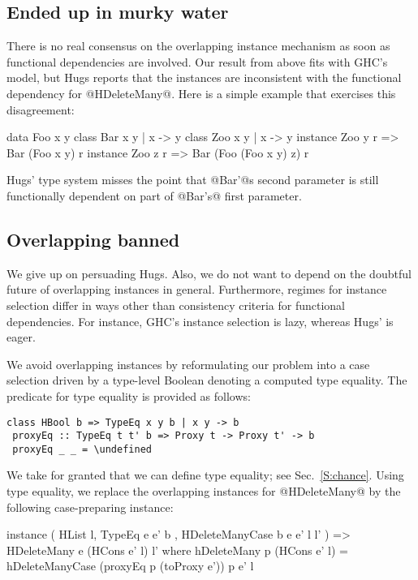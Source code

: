 \documentclass[nocopyrightspace,preprint]{sigplan-proc}
\newcommand{\undefined}{\ensuremath{\bot}}
\begin{document}
\medskip

\subsection*{Ended up in murky water}

There is no real consensus on the overlapping instance mechanism as
soon as functional dependencies are involved. Our result from above
fits with GHC's model, but Hugs reports that the instances are
inconsistent with the functional dependency for @HDeleteMany@. Here is
a simple example that exercises this disagreement:

\begin{code}
 data Foo x y
 class Bar x y | x -> y
 class Zoo x y | x -> y
 instance Zoo y r => Bar (Foo x y) r
 instance Zoo z r => Bar (Foo (Foo x y) z) r
\end{code}

Hugs' type system misses the point that @Bar'@s second parameter is
still functionally dependent on part of @Bar's@ first parameter.


\medskip

\subsection*{Overlapping banned}

We give up on persuading Hugs. Also, we do not want to depend on the
doubtful future of overlapping instances in general. Furthermore,
regimes for instance selection differ in ways other than consistency
criteria for functional dependencies. For instance, GHC's instance
selection is lazy, whereas Hugs' is eager.

We avoid overlapping instances by reformulating our problem into a
case selection driven by a type-level Boolean denoting a computed type
equality. The predicate for type equality is provided as follows:

\begin{Verbatim}[commandchars=\\\{\}]
 class HBool b => TypeEq x y b | x y -> b
 proxyEq :: TypeEq t t' b => Proxy t -> Proxy t' -> b
 proxyEq _ _ = \undefined
\end{Verbatim}

We take for granted that we can define type equality; see
Sec.~\ref{S:chance}. Using type equality, we replace the overlapping
instances for @HDeleteMany@ by the following case-preparing instance:

\begin{code}
 instance ( HList l, TypeEq e e' b
          , HDeleteManyCase b e e' l l' )
      =>    HDeleteMany e (HCons e' l) l'
  where     hDeleteMany p (HCons e' l)
   = hDeleteManyCase (proxyEq p (toProxy e')) p e' l
\end{code}
\end{document}
